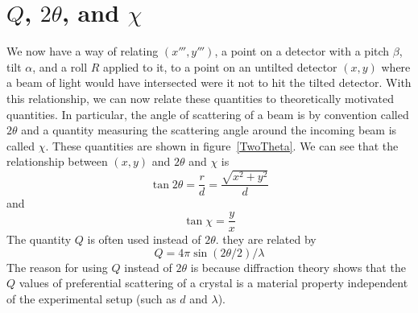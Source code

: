 \section{\texorpdfstring{$Q$, $2\theta$, and $\chi$}{Q, 2theta, and chi}}

\begin{SCfigure}[1][htbp]
    \centering
    
    \caption{For a particular point $(x,y)$, we
    always associate two quantities: $2\theta$ and $\chi$.
    $2\theta$ is the angle of scattering 
    of the beam, or the angle that an incoming beam is 
    deflected by when it diffracts off the crystal. 
    $\chi$ is a measure of the azimuthal angle around 
    the beam. It tells you in what direction radially 
    outwards (with respect to the undeflected beam) 
    the outgoing beam was was scattered.}
    \label{TwoTheta}
\end{SCfigure}

We now have a way of relating $(x''',y''')$, 
a point on a detector with a pitch $\beta$, 
tilt $\alpha$, and a roll $R$ applied to it, 
to a point on an untilted detector $(x,y)$
where a beam of light would have intersected
were it not to hit the tilted detector.
With this relationship, we can now relate
these quantities to theoretically motivated 
quantities. In particular, the angle of scattering 
of a beam is by convention called $2\theta$ and a 
quantity measuring the scattering angle around the 
incoming beam is called $\chi$. These quantities 
are shown in figure~\ref{TwoTheta}. We can see that 
the relationship between $(x,y)$ and $2\theta$ and 
$\chi$ is
\begin{equation}\label{2thetatermsr}
    \tan2\theta = \frac{r}{d} = \frac{\sqrt{x^2+y^2}}{d}
\end{equation}
and
\begin{equation}\label{chitermsyx}
    \tan\chi = \frac{y}{x}
\end{equation}
The quantity $Q$ is often used instead of $2\theta$. 
they are related by
\begin{equation}\label{qterms2theta}
    Q = 4\pi \sin(2\theta/2)/\lambda
\end{equation}
The reason for using $Q$ instead of $2\theta$ is because 
diffraction theory shows that the $Q$ values of preferential 
scattering of a crystal is a material property independent 
of the experimental setup (such as $d$ and $\lambda$). 

